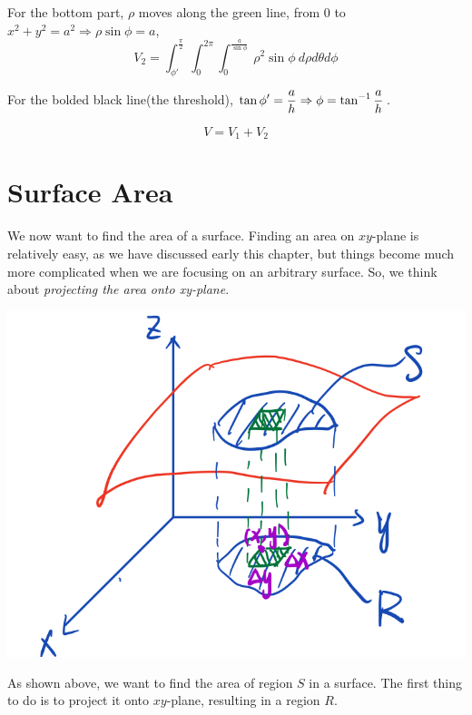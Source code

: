 \begin{spacing}{1.3}
    For the bottom part, $\rho$ moves along the green line, from 0 to $x^2+y^2=a^2\Rightarrow \rho\sin\phi=a$,
    $$V_2=\int_{\phi'}^{\frac{\pi}{2}} \int_0^{2\pi} \int_0^{\frac{a}{\sin\phi}}\ \rho^2\sin\phi\ d\rho d\theta d\phi$$


    For the bolded black line(the threshold), $\displaystyle \tan\phi'=\frac{a}{h}\Rightarrow \phi=\tan^{-1}\frac{a}{h}$.

    $$V=V_1+V_2$$




    

    


    \newpage
    \section{Surface Area}
    
    We now want to find the area of a surface. Finding an area on $xy$-plane is relatively easy, as we 
    have discussed early this chapter, but things become much more complicated when we are focusing
    on an arbitrary surface. So, we think about {\it projecting the area onto xy-plane}.

    \begin{center}
        \includegraphics[scale=0.24]{images/Ch14-surface-area.jpeg}
    \end{center}

    As shown above, we want to find the area of region $S$ in a surface. The first thing to do 
    is to project it onto $xy$-plane, resulting in a region $R$.


\end{spacing}
